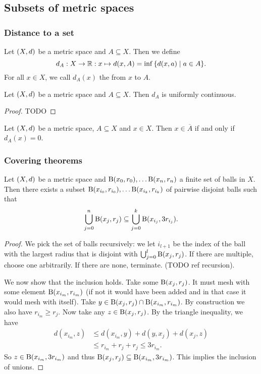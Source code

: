 \subsection{Subsets of metric spaces}
\subsubsection{Distance to a set}
\begin{definition}
Let $\sSet{X,d}$ be a metric space and $A\subseteq X$. Then we define
\[ d_A: X\to \R: x\mapsto d(x,A) = \inf\setbuilder{d(x,a)}{a\in A}. \]
For all $x\in X$, we call $d_A(x)$ the  from $x$ to $A$.
\end{definition}

\begin{lemma} \label{distanceToSetContinuous}
Let $\sSet{X,d}$ be a metric space and $A\subseteq X$. Then $d_A$ is uniformly continuous.
\end{lemma}
\begin{proof}
TODO
\end{proof}

\begin{lemma}
Let $\sSet{X,d}$ be a metric space, $A\subseteq X$ and $x\in X$. Then $x\in \overline{A}$ \textup{if and only if} $d_A(x) = 0$.
\end{lemma}



\subsubsection{Covering theorems}
\begin{proposition}
Let $\sSet{X,d}$ be a metric space and $\operatorname{B}(x_0, r_0), \ldots \operatorname{B}(x_n, r_n)$ a finite set of balls in $X$. Then there exists a subset $\operatorname{B}(x_{i_0}, r_{i_0}), \ldots \operatorname{B}(x_{i_k}, r_{i_k})$ of pairwise disjoint balls such that
\[ \bigcup_{j=0}^n\operatorname{B}(x_j, r_j) \subseteq \bigcup_{j=0}^k \operatorname{B}(x_{i_j}, 3r_{i_j}). \]
\end{proposition}
\begin{proof}
We pick the set of balls recursively: we let $i_{l+1}$ be the index of the ball with the largest radius that is disjoint with $\bigcup_{j=0}^l \operatorname{B}(x_j, r_j)$. If there are multiple, choose one arbitrarily. If there are none, terminate. (TODO ref recursion).

We now show that the inclusion holds. Take some $\operatorname{B}(x_j, r_j)$. It must mesh with some element $\operatorname{B}(x_{i_m}, r_{i_m})$ (if not it would have been added and in that case it would mesh with itself). Take $y\in \operatorname{B}(x_j, r_j) \cap \operatorname{B}(x_{i_m}, r_{i_m})$. By construction we also have $r_{i_m} \geq r_j$. Now take any $z\in \operatorname{B}(x_j, r_j)$. By the triangle inequality, we have
\begin{align*}
d(x_{i_m}, z) &\leq d(x_{i_m}, y) + d(y, x_j) + d(x_j, z) \\
&\leq r_{i_m} + r_j + r_j \leq 3r_{i_m}.
\end{align*}
So $z\in \operatorname{B}(x_{i_m}, 3r_{i_m})$ and thus $\operatorname{B}(x_j, r_j)\subseteq\operatorname{B}(x_{i_m}, 3r_{i_m})$. This implies the inclusion of unions.
\end{proof}

